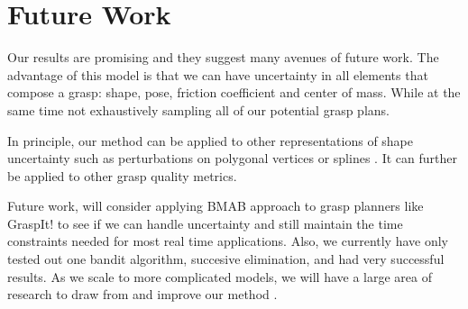 \documentclass[letterpaper, 10 pt, conference]{ieeeconf}  %
\begin{document}
\section{Future Work}
Our results are promising and they suggest many avenues of future work. The advantage of this model is that we can have uncertainty in all elements that compose a grasp: shape, pose, friction coefficient and center of mass. While at the same time not exhaustively sampling all of our potential grasp plans. 

In principle, our method can be applied to other representations of shape uncertainty such as perturbations on polygonal vertices \cite{kehoe2012estimating} or splines \cite{christopoulos2007handling}.
It can further be applied to other grasp quality metrics.

Future work, will consider applying BMAB approach to grasp planners like GraspIt! \cite{miller2004graspit} to see if we can handle uncertainty and still maintain the time constraints needed for most real time applications. Also, we currently have only tested out one bandit algorithm, succesive elimination, and had very successful results. As we scale to more complicated models, we will have a large area of research to draw from and improve our method \cite{bergemann2006bandit}.



\end{document}
